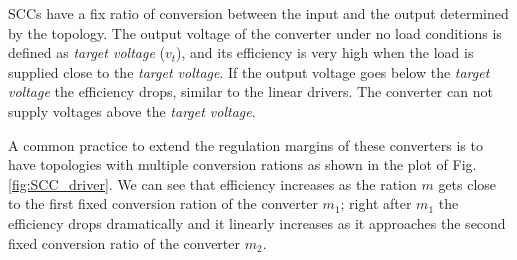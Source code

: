 SCCs have a fix ratio of conversion between the input and the output determined by the topology. The output voltage of the converter under no load conditions is defined as \emph{target voltage} ($v_t$), and its efficiency is very high when the load is supplied close to the \emph{target voltage}. If the output voltage goes below the \emph{target voltage} the efficiency drops, similar to the linear drivers.  The converter can not supply voltages above the \emph{target voltage}.

A common practice to extend the regulation margins of these converters is to have topologies with multiple conversion rations as shown in the plot of Fig. \ref{fig:SCC_driver}. We can see that efficiency increases as the ration $m$ gets close to the first fixed conversion ration of the converter $m_1$; right after $m_1$ the efficiency drops dramatically and it linearly increases as it approaches the second fixed conversion ratio of the converter $m_2$.    

